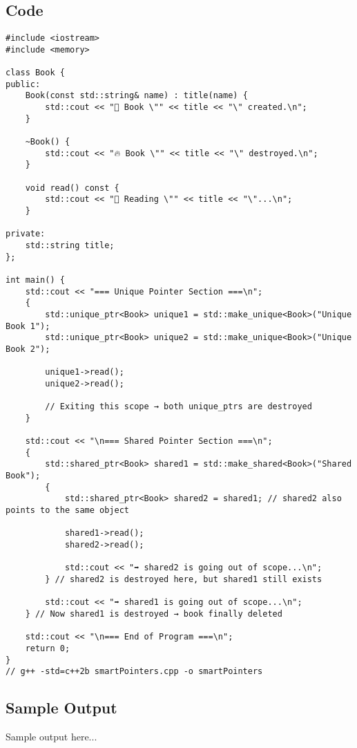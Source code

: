 \documentclass[12pt]{article}
\begin{document}
\subsection*{Code}
\begin{Verbatim}[fontsize=\small,frame=single]
#include <iostream>
#include <memory>

class Book {
public:
    Book(const std::string& name) : title(name) {
        std::cout << "📘 Book \"" << title << "\" created.\n";
    }

    ~Book() {
        std::cout << "🔥 Book \"" << title << "\" destroyed.\n";
    }

    void read() const {
        std::cout << "📖 Reading \"" << title << "\"...\n";
    }

private:
    std::string title;
};

int main() {
    std::cout << "=== Unique Pointer Section ===\n";
    {
        std::unique_ptr<Book> unique1 = std::make_unique<Book>("Unique Book 1");
        std::unique_ptr<Book> unique2 = std::make_unique<Book>("Unique Book 2");

        unique1->read();
        unique2->read();

        // Exiting this scope → both unique_ptrs are destroyed
    }

    std::cout << "\n=== Shared Pointer Section ===\n";
    {
        std::shared_ptr<Book> shared1 = std::make_shared<Book>("Shared Book");
        {
            std::shared_ptr<Book> shared2 = shared1; // shared2 also points to the same object

            shared1->read();
            shared2->read();

            std::cout << "➡️ shared2 is going out of scope...\n";
        } // shared2 is destroyed here, but shared1 still exists

        std::cout << "➡️ shared1 is going out of scope...\n";
    } // Now shared1 is destroyed → book finally deleted

    std::cout << "\n=== End of Program ===\n";
    return 0;
}
// g++ -std=c++2b smartPointers.cpp -o smartPointers
\end{Verbatim}

\subsection*{Sample Output}
\begin{tcolorbox}[colback=black!5!white,colframe=black!75!white]
Sample output here...
\end{tcolorbox}
\newpage
\end{document}
